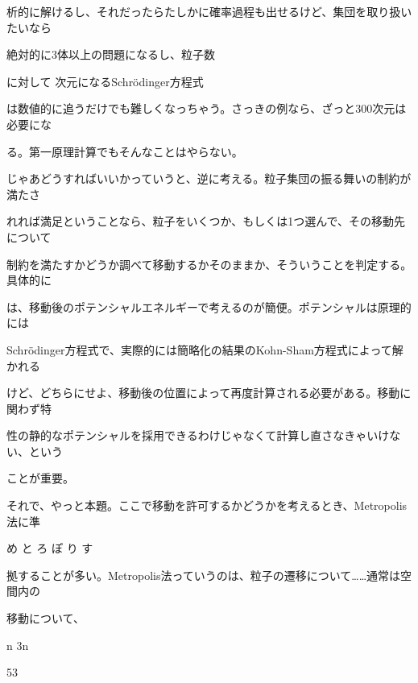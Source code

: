 析的に解けるし、それだったらたしかに確率過程も出せるけど、集団を取り扱いたいなら\par
絶対的に3体以上の問題になるし、粒⼦数\par
に対して  次元になるSchrödinger⽅程式\par
は数値的に追うだけでも難しくなっちゃう。さっきの例なら、ざっと300次元は必要にな\par
る。第⼀原理計算でもそんなことはやらない。\par
じゃあどうすればいいかっていうと、逆に考える。粒⼦集団の振る舞いの制約が満たさ\par
れれば満⾜ということなら、粒⼦をいくつか、もしくは1つ選んで、その移動先について\par
制約を満たすかどうか調べて移動するかそのままか、そういうことを判定する。具体的に\par
は、移動後のポテンシャルエネルギーで考えるのが簡便。ポテンシャルは原理的には\par
Schrödinger⽅程式で、実際的には簡略化の結果のKohn-Sham⽅程式によって解かれる\par
けど、どちらにせよ、移動後の位置によって再度計算される必要がある。移動に関わず特\par
性の静的なポテンシャルを採⽤できるわけじゃなくて計算し直さなきゃいけない、という\par
ことが重要。\par
それで、やっと本題。ここで移動を許可するかどうかを考えるとき、Metropolis法に準\par
め と ろ ぽ り す\par
拠することが多い。Metropolis法っていうのは、粒⼦の遷移について……通常は空間内の\par
移動について、\par
n 3n\par
53\par

